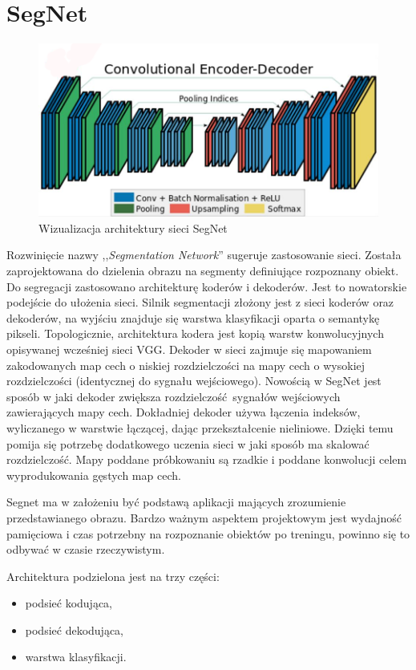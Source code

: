 \documentclass[12pt,a4paper,twoside,titlepage,openright]{book}
\begin{document}
\section{SegNet}
\begin{figure}[ht]
	\centering
			\includegraphics[resolution=100, scale=0.4]{SegNet.png}
		\caption{Wizualizacja architektury sieci SegNet}
\end{figure}
Rozwinięcie nazwy ,,\textit{Segmentation Network}'' sugeruje zastosowanie sieci. Została zaprojektowana do dzielenia obrazu na segmenty definiujące rozpoznany obiekt. Do segregacji zastosowano architekturę koderów i dekoderów. Jest to nowatorskie podejście do ułożenia sieci. Silnik segmentacji złożony jest z sieci koderów oraz dekoderów, na wyjściu znajduje się warstwa klasyfikacji oparta o semantykę pikseli. Topologicznie, architektura kodera jest kopią warstw konwolucyjnych opisywanej wcześniej sieci VGG. Dekoder w sieci zajmuje się mapowaniem zakodowanych map cech o niskiej rozdzielczości na mapy cech o wysokiej rozdzielczości (identycznej do sygnału wejściowego). Nowością w SegNet jest sposób w jaki dekoder zwiększa rozdzielczość sygnałów wejściowych zawierających mapy cech. Dokładniej dekoder używa łączenia indeksów, wyliczanego w warstwie łączącej, dając przekształcenie nieliniowe. Dzięki temu pomija się potrzebę dodatkowego uczenia sieci w jaki sposób ma skalować rozdzielczość. Mapy poddane próbkowaniu są rzadkie i poddane konwolucji celem wyprodukowania gęstych map cech.

Segnet ma w założeniu być podstawą aplikacji mających zrozumienie przedstawianego obrazu. Bardzo ważnym aspektem projektowym jest wydajność pamięciowa i czas potrzebny na rozpoznanie obiektów po treningu, powinno się to odbywać w czasie rzeczywistym.

Architektura podzielona jest na trzy części:
\begin{itemize}
\item podsieć kodująca,
\item podsieć dekodująca,
\item warstwa klasyfikacji.
\end{itemize}
\end{document}
